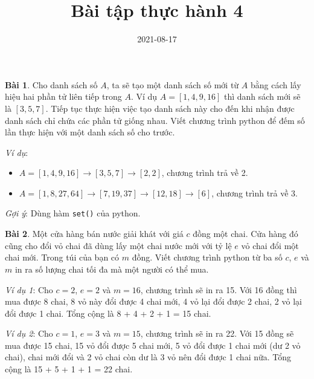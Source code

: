 \documentclass[12pt, a4paper]{article}
\title{Bài tập thực hành 4}
\date{2021-08-17}
\author{}
\begin{document}
    \onehalfspacing
    \maketitle
    \textbf{Bài 1}. Cho danh sách số $A$, ta sẽ tạo một danh sách số mới từ $A$
    bằng cách lấy hiệu hai phần tử liên tiếp trong $A$. 
    Ví dụ $A = [1, 4, 9, 16]$ thì danh sách mới sẽ là $[3, 5, 7]$.
    Tiếp tục thực hiện việc tạo danh sách này cho đến khi nhận được danh sách chỉ chứa các phần tử giống nhau.
    Viết chương trình python để đếm số lần thực hiện với một danh sách số cho trước.
    
    \textit{Ví dụ}:
    \begin{itemize}
        \item $A = [1, 4, 9, 16] \rightarrow [3, 5, 7] \rightarrow [2, 2]$, chương trình trả về 2.
        \item $A = [1, 8, 27, 64] \rightarrow [7, 19, 37] \rightarrow [12, 18] \rightarrow [6]$, chương trình trả về 3.
    \end{itemize}

    \textit{Gợi ý}: Dùng hàm \texttt{set()} của python.

    \textbf{Bài 2}. Một cửa hàng bán nước giải khát với giá $c$ đồng một chai.
    Cửa hàng đó cũng cho đổi vỏ chai đã dùng lấy một chai nước mới với tỷ lệ $e$ vỏ chai đổi một chai mới.
    Trong túi của bạn có $m$ đồng. Viết chương trình python từ ba số $c$, $e$ và $m$ in ra số lượng chai tối đa mà một người có thể mua.

    \textit{Ví dụ 1}: Cho $c = 2$, $e = 2$ và $m = 16$, chương trình sẽ in ra 15. 
    Với 16 đồng thì mua được 8 chai, 8 vỏ này đổi được 4 chai mới, 4 vỏ lại đổi được 2 chai,
    2 vỏ lại đổi được 1 chai. Tổng cộng là 8 + 4 + 2 + 1 = 15 chai.

    \textit{Ví dụ 2}: Cho $c = 1$, $e = 3$ và $m = 15$, chương trình sẽ in ra 22.
    Với 15 đồng sẽ mua được 15 chai, 15 vỏ đổi được 5 chai mới, 5 vỏ đổi được 1 chai mới (dư 2 vỏ chai),
    chai mới đổi và 2 vỏ chai còn dư là 3 vỏ nên đổi được 1 chai nữa. Tổng cộng là 15 + 5 + 1 + 1 = 22 chai.
\end{document}
